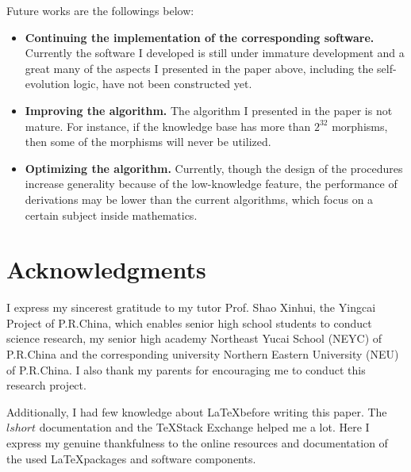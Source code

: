 \documentclass[preprint]{elsarticle}
\numberwithin{theorem}{section}	%
\numberwithin{axiom}{section}	%
\numberwithin{definition}{section}	%
\begin{document}
Future works are the followings below:
\begin{itemize}
	\item \textbf{Continuing the implementation of the corresponding software.} Currently the software I developed is still under immature development and a great many of the aspects I presented in the paper above, including the self-evolution logic, have not been constructed yet.
	\item  \textbf{Improving the algorithm.} The algorithm I presented in the paper is not mature. For instance, if the knowledge base has more than \(2^{32}\) morphisms, then some of the morphisms will never be utilized.
	\item \textbf{Optimizing the algorithm.} Currently, though the design of the procedures increase generality because of the low-knowledge feature, the performance of derivations may be lower than the current algorithms, which focus on a certain subject inside mathematics.
\end{itemize}

\section{Acknowledgments}
I express my sincerest gratitude to my tutor Prof. Shao Xinhui, the Yingcai Project of P.R.China, which enables senior high school students to conduct science research, my senior high academy Northeast Yucai School (NEYC) of P.R.China and the corresponding university Northern Eastern University (NEU) of P.R.China. I also thank my parents for encouraging me to conduct this research project.

Additionally, I had few knowledge about \LaTeX before writing this paper. The $lshort$ documentation and the \TeX Stack Exchange helped me a lot. Here I express my genuine thankfulness to the online resources and documentation of the used \LaTeX packages and software components.



\end{document}
